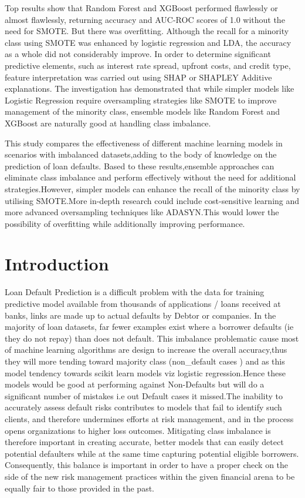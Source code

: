 \documentclass[12pt, a4paper,oneside]{book}
\numberwithin{equation}{section}
\begin{document}
Top results show that Random Forest and XGBoost performed flawlessly or almost flawlessly, returning accuracy and AUC-ROC scores of 1.0 without the need for SMOTE. But there was overfitting. Although the recall for a minority class using SMOTE was enhanced by logistic regression and LDA, the accuracy as a whole did not considerably improve. In order to determine significant predictive elements, such as interest rate spread, upfront costs, and credit type, feature interpretation was carried out using SHAP or SHAPLEY Additive explanations. The investigation has demonstrated that while simpler models like Logistic Regression require oversampling strategies like SMOTE to improve management of the minority class, ensemble models like Random Forest and XGBoost are naturally good at handling class imbalance.

This study compares the effectiveness of different machine learning models in scenarios with imbalanced datasets,adding to the body of knowledge on the prediction of loan defaults. Based to these results,ensemble approaches can eliminate class imbalance and perform effectively without the need for additional strategies.However, simpler models can enhance the recall of the minority class by utilising SMOTE.More in-depth research could include cost-sensitive learning and more advanced oversampling techniques like ADASYN.This would lower the possibility of overfitting while additionally improving performance.

\newpage
\tableofcontents
\listoffigures
\listoftables
\newpage
\chapter{Introduction}\label{ch:1}

Loan Default Prediction is a difficult problem with the data for training predictive model available from thousands of applications / loans received at banks, links are made up to actual defaults by Debtor or companies. In the majority of loan datasets, far fewer examples exist where a borrower defaults (ie they do not repay) than does not default. This imbalance problematic cause most of machine learning algorithms are design to increase the overall accuracy,thus they will more tending toward majority class (non\_default cases ) and as this model tendency towards scikit learn models viz logistic regression.Hence these models would be good at performing against Non-Defaults but will do a significant number of mistakes i.e out Default cases it missed.The inability to accurately assess default risks contributes to models that fail to identify such clients, and therefore undermines efforts at risk management, and in the process opens organizations to higher loss outcomes. Mitigating class imbalance is therefore important in creating accurate, better models that can easily detect potential defaulters while at the same time capturing potential eligible borrowers. Consequently, this balance is important in order to have a proper check on the side of the new risk management practices within the given financial arena to be equally fair to those provided in the past. 
\end{document}
